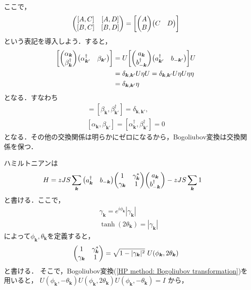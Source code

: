 \documentclass[dvipdfmx,9pt]{beamer}
\numberwithin{equation}{section}
\begin{document}
\begin{frame}
    ここで，
    \begin{align}
        \mqty(
            [A,C] & [A,D] \\ 
            [B,C] & [B,D]
            )
        = \qty[\mqty(A\\B)\mqty(C&D)]
    \end{align}
    という表記を導入しよう．すると，
    \begin{align}
        \qty[\mqty(\alpha_{\bm{k}}\\ \beta_{\bm{k}}^\dagger)\mqty(\alpha_{\bm{k}'}^\dagger & \beta_{\bm{k}'})]
        &\nonumber
        =
        U\qty[\mqty(a_{\bm{k}}\\ b_{-\bm{k}}^\dagger)\mqty(a_{\bm{k}'}^\dagger & b_{-\bm{k}'})]U
        \\ &\nonumber
        = \delta_{\bm{k},\bm{k}'}U \eta U
        = \delta_{\bm{k},\bm{k}'} U\eta U \eta \eta
        \\ &
        = \delta_{\bm{k},\bm{k}'}\eta
    \end{align}
    となる．すなわち
    \begin{gather}
        [\alpha_{\bm{k}}, \alpha_{\bm{k}'}^\dagger] = [\beta_{\bm{k}}, 
        \beta_{\bm{k}'}^\dagger] = \delta_{\bm{k},\bm{k}'},
        \\
        [\alpha_{\bm{k}},\beta_{\bm{k}'}] = [\alpha_{\bm{k}}^\dagger, \beta_{\bm{k}'}^\dagger] = 0
    \end{gather}
    となる．その他の交換関係は明らかにゼロになるから，Bogoliubov変換は交換関係を保つ．
\end{frame}

\begin{frame}{}
    ハミルトニアンは
    \begin{align}
        H
        &
        = zJS \sum_{\bm{k}}\mqty(a_{\bm{k}}^\dagger & b_{-\bm{k}})\mqty(1 & \gamma_{\bm{k}}^* \\ \gamma_{\bm{k}} &1)\mqty(a_{\bm{k}}\\b_{-\bm{k}}^\dagger) - zJS \sum_{\bm{k}} 1
    \end{align}
    と書ける．ここで，
    \begin{align}
        &
        \gamma_{\bm{k}} = e^{i\phi_{\bm{k}}}|\gamma_{\bm{k}}|
        \\ &
        \tanh(2\theta_{\bm{k}}) = |\gamma_{\bm{k}}|
    \end{align}
    によって$\phi_{\bm{k}},\theta_{\bm{k}}$を定義すると，
    \begin{align}
        \mqty(1 & \gamma_{\bm{k}}^* \\ \gamma_{\bm{k}} &1) = \sqrt{1-|\gamma_{\bm{k}}|^2}~U(\phi_{\bm{k}},2\theta_{\bm{k}})
    \end{align}
    と書ける．
    そこで，Bogoliubov変換(\ref{HP method: Bogoliubov transformation})を用いると，
    $U(\phi_{\bm{k}},-\theta_{\bm{k}})U(\phi_{\bm{k}},2\theta_{\bm{k}})U(\phi_{\bm{k}},-\theta_{\bm{k}}) = I$
    から，
\end{frame}
\end{document}
